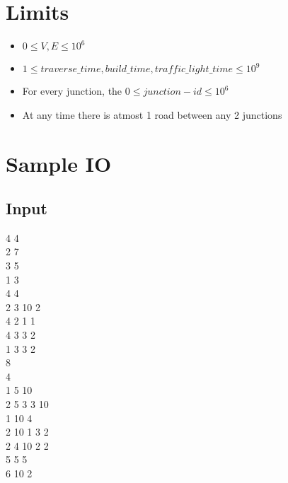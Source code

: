 \documentclass[20pt]{article}
\begin{document}
\section{Limits}
\begin{itemize}
\item $0 \leq V, E \leq 10^6$
\item $1 \leq traverse\_time, build\_time, traffic\_light\_time \leq 10^9$
\item For every junction, the $0 \leq junction-id \leq 10^6$
\item At any time there is atmost 1 road between any 2 junctions
\end{itemize}


\section{Sample IO}
\subsection{Input}
\hspace{10mm} 4 4\\
\-\hspace{10mm} 2 7\\
\-\hspace{10mm} 3 5\\
\-\hspace{10mm} 1 3\\
\-\hspace{10mm} 4 4\\
\-\hspace{10mm} 2 3 10 2\\
\-\hspace{10mm} 4 2 1 1\\
\-\hspace{10mm} 4 3 3 2\\
\-\hspace{10mm} 1 3 3 2\\
\-\hspace{10mm} 8\\
\-\hspace{10mm} 4\\
\-\hspace{10mm} 1 5 10\\
\-\hspace{10mm} 2 5 3 3 10\\
\-\hspace{10mm} 1 10 4\\
\-\hspace{10mm} 2 10 1 3 2\\
\-\hspace{10mm} 2 4 10 2 2\\
\-\hspace{10mm} 5 5 5\\
\-\hspace{10mm} 6 10 2\\
\end{document}
